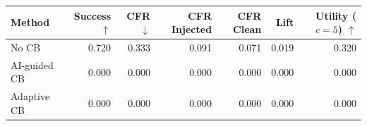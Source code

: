 \begin{tabular}{lrrrrrr}
\toprule
Method & Success $\uparrow$ & CFR $\downarrow$ & CFR Injected & CFR Clean & Lift & Utility ($c=5$) $\uparrow$ \\
\midrule
No CB & 0.720 & 0.333 & 0.091 & 0.071 & 0.019 & 0.320 \\
AI-guided CB & 0.000 & 0.000 & 0.000 & 0.000 & 0.000 & 0.000 \\
Adaptive CB & 0.000 & 0.000 & 0.000 & 0.000 & 0.000 & 0.000 \\
\bottomrule
\end{tabular}
